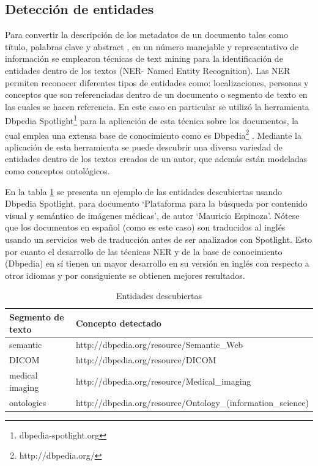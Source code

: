 \documentclass[conference]{IEEEtran}
\begin{document}
\subsection{Detección de entidades}
Para convertir la descripción de los metadatos de un documento tales como título, palabras clave y abstract , en un número manejable y representativo de información se emplearon técnicas de text mining para la identificación de entidades dentro de los textos (NER- Named Entity Recognition). Las NER  permiten reconocer diferentes tipos de entidades como: localizaciones, personas y conceptos que son referenciadas dentro de un documento o  segmento de texto en las cuales se hacen referencia.  En este caso en particular se utilizó la herramienta Dbpedia Spotlight\footnote{dbpedia-spotlight.org} para la aplicación de esta técnica sobre los documentos, la cual emplea una extensa base de conocimiento como es  Dbpedia\footnote{http://dbpedia.org/} \cite{mendes2011dbpedia}. Mediante la aplicación de esta herramienta se puede descubrir una diversa variedad de entidades dentro de los textos creados de un autor, que además están modeladas como conceptos ontológicos. 

En la tabla \ref{tb:entidades} se presenta un ejemplo de las entidades descubiertas usando Dbpedia Spotlight, para documento ‘Plataforma para la búsqueda por contenido visual y semántico de imágenes médicas’, de autor ‘Mauricio Espinoza’. Nótese que los documentos en español (como es este caso) son traducidos al inglés usando un servicios web de traducción antes de ser analizados con Spotlight. Esto por cuanto el desarrollo de las técnicas NER y de la base de conocimiento (Dbpedia) en sí tienen un mayor desarrollo en su versión en inglés con respecto a otros idiomas y por consiguiente se obtienen mejores resultados.

\begin{table}[]
\centering
\caption{Entidades descubiertas}
\label{tb:entidades}
\begin{tabular}{@{}ll@{}}
\toprule
Segmento de texto & Concepto detectado                                           \\ \midrule
semantic          & http://dbpedia.org/resource/Semantic\_Web                    \\
DICOM             & http://dbpedia.org/resource/DICOM                            \\
medical imaging   & http://dbpedia.org/resource/Medical\_imaging                 \\
ontologies        & http://dbpedia.org/resource/Ontology\_(information\_science) \\ \bottomrule
\end{tabular}
\end{table}
\end{document}
